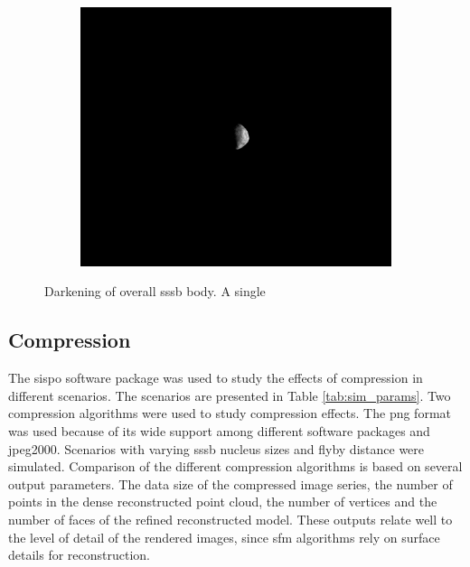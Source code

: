 \begin{figure}[htb]
\begin{subfigure}[b]{0.32\textwidth}
            \label{fig:composition_dark_2}
        \end{subfigure}
        \begin{subfigure}[b]{0.32\textwidth}
            \centering
            \includegraphics[width=\textwidth]{doc/thesis/0_figures/composition_darkening/Inst_2017-08-15T115819-007000.png}
            \label{fig:composition_dark_3}
        \end{subfigure}
    \caption{Darkening of overall \gls{sssb} body. A single}
    \label{fig:composition_dark}
\end{figure}

\subsection{Compression} \label{sec:results_comp}
The \gls{sispo} software package was used to study the effects of compression in different scenarios. The scenarios are presented in Table \ref{tab:sim_params}. Two compression algorithms were used to study compression effects. The \gls{png} format was used because of its wide support among different software packages and \gls{jpeg}2000. Scenarios with varying \gls{sssb} nucleus sizes and flyby distance were simulated. 
Comparison of the different compression algorithms is based on several output parameters. The data size of the compressed image series, the number of points in the dense reconstructed point cloud, the number of vertices and the number of faces of the refined reconstructed model. These outputs relate well to the level of detail of the rendered images, since \gls{sfm} algorithms rely on surface details for reconstruction.

